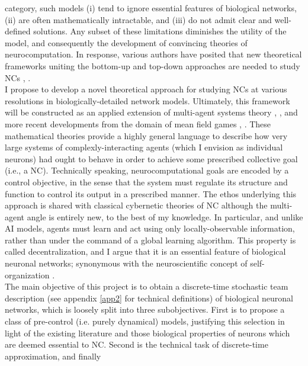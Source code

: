 \documentclass[12pt, oneside]{report}
\newcommand{\1}[1]{\mathbbm{1}_{\{#1\}}}
\theoremstyle{definition}
\begin{document}
category, such models (i) tend to ignore essential features of biological
networks, (ii) are often mathematically intractable, and (iii) do not admit
clear and well-defined solutions. Any subset of these limitations diminishes the
utility of the model, and consequently the development of convincing theories of
neurocomputation. In response, various authors have posited that new theoretical
frameworks uniting the bottom-up and top-down approaches are needed to study NCs
\cite{Jaeger_Noheda_vanderWiel_2023}, \cite{Aimone_Parekh_2023}.\\[5pt]
\indent I propose to develop a novel theoretical approach for studying NCs at
various resolutions in biologically-detailed network models. Ultimately, this
framework will be constructed as an applied extension of multi-agent systems
theory \cite{Radner_1962}, \cite{Witsenhausen_1973}, \cite{Yuksel_Basar_2024}
and more recent developments from the domain of mean field games
\cite{Huang_Malhame_Caines_2006}, \cite{Lasry_Lions_2007}. These mathematical
theories provide a highly general language to describe how very large systems of
complexly-interacting agents (which I envision as individual neurons) had ought
to behave in order to achieve some prescribed collective goal (i.e., a NC).
Technically speaking, neurocomputational goals are encoded by a control
objective, in the sense that the system must regulate its structure and function
to control its output in a prescribed manner. The ethos underlying this approach
is shared with classical cybernetic theories of NC \cite{Wiener_1948} although
the multi-agent angle is entirely new, to the best of my knowledge. In
particular, and unlike AI models, agents must learn and act using only
locally-observable information, rather than under the command of a global
learning algorithm. This property is called decentralization, and I argue that
it is an essential feature of biological neuronal networks; synonymous with the
neuroscientific concept of self-organization \cite{Park_Friston_2013}.\\[5pt]
\indent The main objective of this project is to obtain a discrete-time
stochastic team description (see appendix \ref{app2} for technical definitions) of biological neuronal networks, which is loosely
split into three subobjectives. First is to propose a class of pre-control (i.e.
purely dynamical) models, justifying this selection in light of the existing
literature and those biological properties of neurons which are deemed essential
to NC. Second is the technical task of discrete-time approximation, and finally
\end{document}
